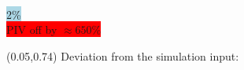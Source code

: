 {\begin{textblock}{0.28}
\\
\vspace{1cm}
\colorbox{lightblue}{
2\%}\\[0.1cm]

\colorbox{red}{PIV off by $\approx 650\%$}
\end{textblock}

\begin{textblock}{0.9}(0.05,0.74)
	\centering
	Deviation from the simulation input:
\end{textblock}
}






